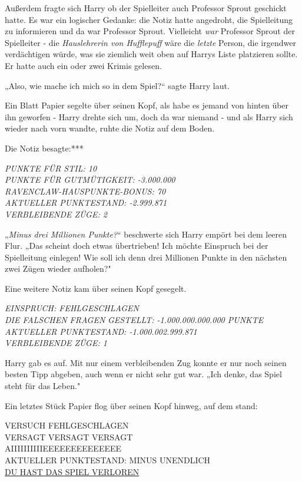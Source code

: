 {Außerdem fragte sich Harry ob der Spielleiter auch Professor Sprout geschickt hatte. Es war ein logischer Gedanke: die Notiz hatte angedroht, die Spielleitung zu informieren und da war Professor Sprout. Vielleicht \emph{war} Professor Sprout der Spielleiter - die \emph{Hauslehrerin von Hufflepuff} wäre die \emph{letzte} Person, die irgendwer verdächtigen würde, was sie ziemlich weit oben auf Harrys Liste platzieren sollte. Er hatte auch ein oder zwei Krimis gelesen.

„Also, wie mache ich mich so in dem Spiel?“ sagte Harry laut.

Ein Blatt Papier segelte über seinen Kopf, als habe es jemand von hinten über ihn geworfen - Harry drehte sich um, doch da war niemand - und als Harry sich wieder nach vorn wandte, ruhte die Notiz auf dem Boden.

Die Notiz besagte:***

\emph{PUNKTE FÜR STIL: 10\\ PUNKTE FÜR GUTMÜTIGKEIT: -3.000.000\\ RAVENCLAW-HAUSPUNKTE-BONUS: 70\\ AKTUELLER PUNKTESTAND: -2.999.871\\ VERBLEIBENDE ZÜGE: 2}

„\emph{Minus drei Millionen Punkte?}“ beschwerte sich Harry empört bei dem leeren Flur. „Das scheint doch etwas übertrieben! Ich möchte Einspruch bei der Spielleitung einlegen! Wie soll ich denn drei Millionen Punkte in den nächsten zwei Zügen wieder aufholen?"

Eine weitere Notiz kam über seinen Kopf gesegelt.

\emph{EINSPRUCH: FEHLGESCHLAGEN\\ DIE FALSCHEN FRAGEN} \emph{GESTELLT: -1.000.000.000.000 PUNKTE\\ AKTUELLER PUNKTESTAND: -1.000.002.999.871\\ VERBLEIBENDE ZÜGE: 1}

Harry gab es auf. Mit nur einem verbleibenden Zug konnte er nur noch seinen besten Tipp abgeben, auch wenn er nicht sehr gut war. „Ich denke, das Spiel steht für das Leben."

Ein letztes Stück Papier flog über seinen Kopf hinweg, auf dem stand:

VERSUCH FEHLGESCHLAGEN\\ VERSAGT VERSAGT VERSAGT\\ AIIIIIIIIIIEEEEEEEEEEEEEE\\ AKTUELLER PUNKTESTAND: MINUS UNENDLICH\\ \uline{DU HAST DAS SPIEL VERLOREN}

}
